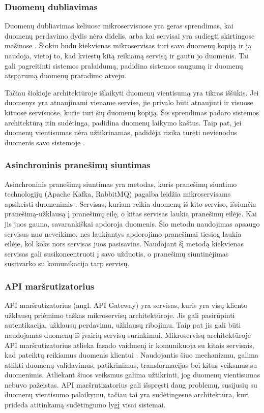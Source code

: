 \documentclass[fleqn]{VUMIFPSkursinis}
\begin{document}
\subsubsection{Duomenų dubliavimas}
Duomenų dubliavimas keliuose mikroservisuose yra geras sprendimas, kai duomenų perdavimo dydis nėra didelis, arba kai servisai yra sudiegti skirtingose mašinose \cite{LL19}. Šiokiu būdu kiekvienas mikroservisas turi savo duomenų kopiją ir ją naudoja, vietoj to, kad kviestų kitą reikiamą servisą ir gautu jo duomenis. Tai gali pagreitinti sistemos pralaidumą, padidina sistemos saugumą ir duomenų atsparumą duomenų praradimo atveju.

Tačiau šiokioje architektūroje išlaikyti duomenų vientisumą yra tikras iššūkis. Jei duomenys yra atnaujinami viename servise, jie privalo būti atnaujinti ir visuose kituose servisuose, kurie turi šių duomenų kopiją. Šis sprendimas padaro sistemos architektūrą itin sudėtinga, padidina duomenų laikymo kaštus. Taip pat, jei duomenų vientisumas nėra užtikrinamas, padidėja rizika turėti nevienodus duomenis savo sistemoje \cite{LZS+21}.

\subsubsection{Asinchroninis pranešimų siuntimas}
Asinchroninis pranešimų siuntimas yra metodas, kuris pranešimų siuntimo technologijų (Apache Kafka, RabbitMQ) pagalba leidžia mikroservisams apsikeisti duomenimis \cite{MGT+20}. Servisas, kuriam reikia duomenų iš kito serviso, išsiunčia pranešimą-užklausą į pranešimų eilę, o kitas servisas laukia pranešimų eilėje. Kai jis juos gauna, savarankiškai apdoroja duomenis. Šio metodu naudojimas apsaugo servisus nuo neveikimo, nes laukiantys apdorojimo pranešimai tiesiog laukia eilėje, kol koks nors servisas juos pasisavins. Naudojant šį metodą kiekvienas servisas gali susikoncentruoti į savo užduotis, o pranešimų siuntinėjimas susitvarko su komunikacija tarp servisų.

\subsubsection{API maršrutizatorius}
API maršrutizatorius (angl. API Gateway) yra servisas, kuris yra visų kliento užklausų priėmimo taškas mikroservisų architektūroje. Jis gali pasirūpinti autentikacija, užklausų perdavimu, užklausų ribojimu. Taip pat jis gali būti naudojamas duomenų iš įvairių servisų surinkimui. Mikroservisų architektūroje API maršrutizatorius atlieka fasado vaidmenį ir komunikuoja su kitais servisais, kad pateiktų reikiamus duomenis klientui \cite{ZJJ18}. Naudojantis šiuo mechanizmu, galima atlikti duomenų validavimus, patikrinimus, transformacijas bei kitus veiksmus su duomenimis. Atliekant šiuos veiksmus galima užtikrinti, jog duomenų vientisumas nebuvo pažeistas. API maršrutizatorius gali išspręsti daug problemų, susijusių su duomenų vientisumo palaikymu, tačiau tai yra sudėtingesnė architektūra, kuri prideda atitinkamą sudėtingumo lygį visai sistemai.
\end{document}
